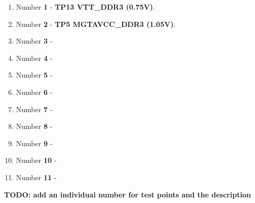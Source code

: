 \documentclass[12pt,oneside,a4]{article}
\begin{document}
\begin{enumerate}[label=(\alph*)]
	\item Number \textbf{1} - \textbf{TP13 VTT\_DDR3 (0.75V)}.
	\item Number \textbf{2} - \textbf{TP5 MGTAVCC\_DDR3 (1.05V)}.
	\item Number \textbf{3} - 
	\item Number \textbf{4} - 
	\item Number \textbf{5} - 
	\item Number \textbf{6} - 
	\item Number \textbf{7} - 
	\item Number \textbf{8} - 
	\item Number \textbf{9} - 
	\item Number \textbf{10} - 
	\item Number \textbf{11} - 
	
\end{enumerate}

\textbf{TODO: add an individual number for test points and the description
}
\begin{thebibliography}{99}
\end{thebibliography}
\end{document}
